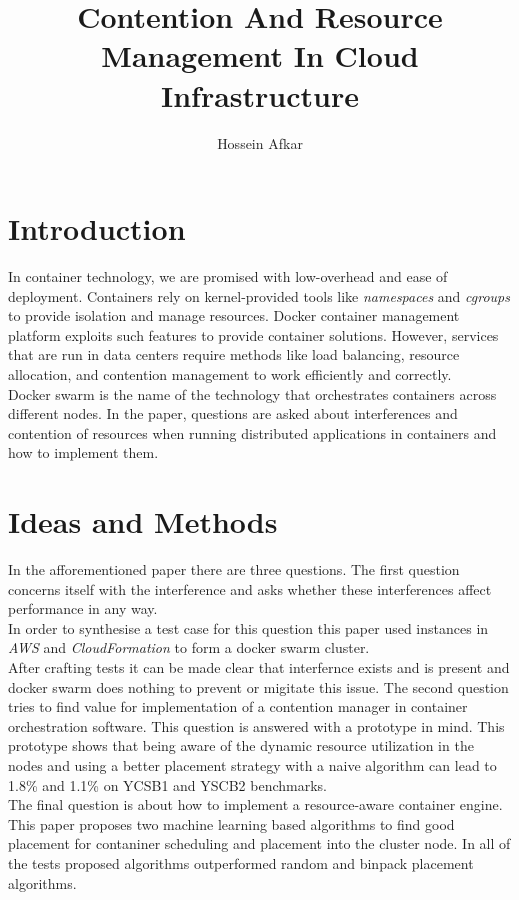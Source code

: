 \documentclass[a4paper, 11pt]{article}
\title{Contention And Resource Management In Cloud Infrastructure}
\author{Hossein Afkar}
\theoremstyle{nonumberplain}
\begin{document}
\maketitle

\section{Introduction}
In container technology, we are promised with low-overhead and ease
of deployment. Containers rely on kernel-provided tools like
\textit{namespaces} and \textit{cgroups} to provide isolation and manage
resources. Docker container management platform exploits such features
to provide container solutions. However, services that are run in
data centers require methods like load balancing, resource allocation, and 
contention management to work efficiently and correctly. \\
Docker swarm is the name of the technology that orchestrates containers
across different nodes. In the paper, \cite{paper} questions are asked
about interferences and contention of resources when running
distributed applications in containers and how to implement them.

\section{Ideas and Methods}
In the afforementioned paper there are three questions.
The first question concerns itself with the interference and asks whether
these interferences affect performance in any way. \\
In order to synthesise a test case for this question this paper used instances
in \textit{AWS} and \textit{CloudFormation} to form a docker swarm cluster. \\
After crafting tests it can be made clear that interfernce exists and is
present and docker swarm does nothing to prevent or migitate this issue.
The second question tries to find value for implementation of a contention
manager in container orchestration software. This question is answered with
a prototype in mind. This prototype shows that being aware of the dynamic
resource utilization in the nodes and using a better placement strategy
with a naive algorithm can lead to 1.8\% and 1.1\% on YCSB1 and YSCB2
benchmarks. \\
The final question is about how to implement a resource-aware container engine.
This paper proposes two machine learning based algorithms to find good
placement for contaniner scheduling and placement into the cluster node.
In all of the tests proposed algorithms outperformed random and binpack
placement algorithms. 
\end{document}
